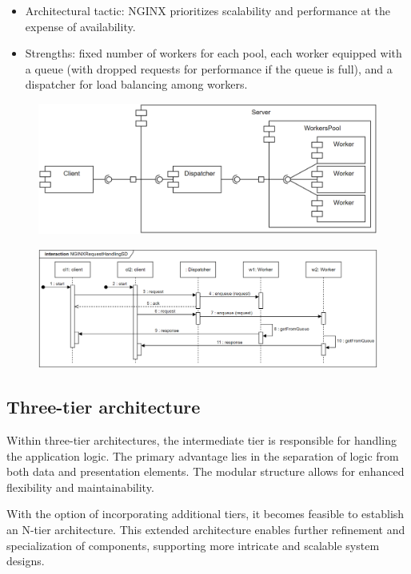 \begin{itemize}
\begin{itemize}
            \item Architectural tactic: NGINX prioritizes scalability and performance at the expense of availability.
            \item Strengths: fixed number of workers for each pool, each worker equipped with a queue (with dropped requests for performance if the queue is full), and a dispatcher for load balancing among workers.
        \end{itemize}    
        \begin{figure}[H]
            \centering
            \includegraphics[width=0.5\linewidth]{images/work.png}
        \end{figure}
        \begin{figure}[H]
            \centering
            \includegraphics[width=0.9\linewidth]{images/work1.png}
        \end{figure}
\end{itemize}

\subsection{Three-tier architecture}
Within three-tier architectures, the intermediate tier is responsible for handling the application logic. 
The primary advantage lies in the separation of logic from both data and presentation elements. 
The modular structure allows for enhanced flexibility and maintainability.

With the option of incorporating additional tiers, it becomes feasible to establish an N-tier architecture. 
This extended architecture enables further refinement and specialization of components, supporting more intricate and scalable system designs.

